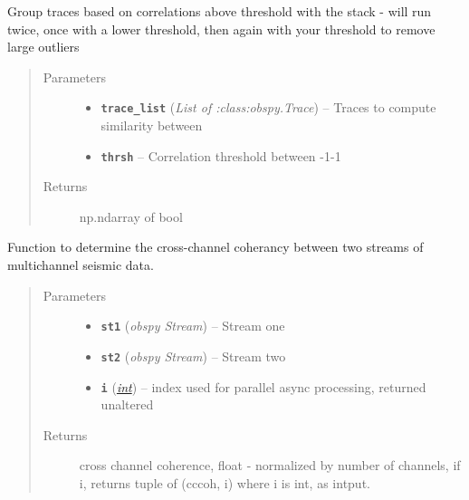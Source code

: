 \documentclass[a4paper,10pt,english]{sphinxmanual}
\begin{document}

\begin{fulllineitems}
\label{submodules/utils.clustering:clustering.corr_cluster}
Group traces based on correlations above threshold with the stack - will
run twice, once with a lower threshold, then again with your threshold to
remove large outliers
\begin{quote}\begin{description}
\item[{Parameters}] \leavevmode\begin{itemize}
\item {} 
\textbf{\texttt{trace\_list}} (\emph{List of :class:obspy.Trace}) -- Traces to compute similarity between

\item {} 
\textbf{\texttt{thrsh}} -- Correlation threshold between -1-1

\end{itemize}

\item[{Returns}] \leavevmode
np.ndarray of bool

\end{description}\end{quote}

\end{fulllineitems}


\begin{fulllineitems}
\label{submodules/utils.clustering:clustering.cross_chan_coherence}
Function to determine the cross-channel coherancy between two streams of
multichannel seismic data.
\begin{quote}\begin{description}
\item[{Parameters}] \leavevmode\begin{itemize}
\item {} 
\textbf{\texttt{st1}} (\emph{obspy Stream}) -- Stream one

\item {} 
\textbf{\texttt{st2}} (\emph{obspy Stream}) -- Stream two

\item {} 
\textbf{\texttt{i}} (\href{https://docs.python.org/library/functions.html\#int}{\emph{int}}) -- index used for parallel async processing, returned unaltered

\end{itemize}

\item[{Returns}] \leavevmode
cross channel coherence, float - normalized by number of channels,
if i, returns tuple of (cccoh, i) where i is int, as intput.

\end{description}\end{quote}

\end{fulllineitems}
\end{document}
